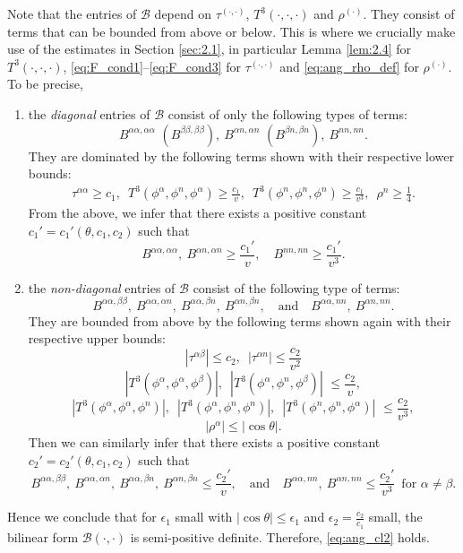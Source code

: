 \documentclass[12pt]{article}
\numberwithin{equation}{section}
\theoremstyle{plain}
\theoremstyle{definition}
\theoremstyle{remark}
\begin{document}
Note that the entries of $\mathcal{B}$ depend on $\tau^{(\cdot, \cdot)}$, $T^3(\cdot, \cdot, \cdot)$ and $\rho^{(\cdot)}$. They consist of terms that can be bounded from above or below. This is where we crucially make use of the estimates in Section \ref{sec:2.1}, in particular Lemma \ref{lem:2.4} for $T^3(\cdot, \cdot, \cdot)$, \eqref{eq:F_cond1}--\eqref{eq:F_cond3} for $\tau^{(\cdot, \cdot)}$ and \eqref{eq:ang_rho_def} for $\rho^{(\cdot)}$. To be precise, 
\begin{enumerate}
\item 
the \emph{diagonal} entries of $\mathcal{B}$ consist of only the following types of terms:
\[
B^{\alpha\alpha,\alpha\alpha}\,\,(B^{\beta\beta,\beta\beta}), 
\ B^{\alpha n,\alpha n}\,\,(B^{\beta n,\beta n}), 
\ B^{nn,nn}.
\]
They are dominated by the following terms shown with their respective lower bounds:
\begin{eqnarray*}
\tau^{\alpha\alpha} \geq c_1,\,\,\,
T^3(\phi^\alpha,\phi^n,\phi^\alpha)\geq \frac{c_1}{v},\,\,\,
T^3(\phi^n,\phi^n,\phi^n)\geq \frac{c_1}{v^3},\,\,\,
\rho^n \geq \frac14.
\end{eqnarray*}
From the above, we infer that there exists a positive constant $c_1'=c_1'(\theta,c_1,c_2)$ such that
\begin{equation*}
    B^{\alpha\alpha,\alpha\alpha}, \ B^{\alpha n,\alpha n} \geq \frac{c_1'}{v}, \quad B^{nn,nn} \geq \frac{c_1'}{v^3}.
\end{equation*}
\item 
the \emph{non-diagonal} entries of $\mathcal{B}$ consist of the following type of terms:
\[
    B^{\alpha\alpha,\beta\beta}, \ B^{\alpha \alpha, \alpha n} , \ B^{\alpha \alpha,\beta n}, \  B^{\alpha n,\beta n}, \quad \text{and}\quad
    B^{\alpha \alpha, n n} , \  B^{\alpha n, n n}.
\]
They are bounded from above by the following terms shown again with their respective
upper bounds:
\[
|\tau^{\alpha\beta}|\leq c_2,\,\,\,
|\tau^{\alpha n}|\leq\frac{c_2}{v^2}
\]\[
\left|T^3(\phi^\alpha, \phi^\alpha, \phi^\beta)\right|,\,\,\,
\left|T^3(\phi^\alpha, \phi^n, \phi^\beta)\right|\,\,\leq \frac{c_2}{v},
\]\[
\left|T^3(\phi^\alpha, \phi^\alpha, \phi^n)\right|,\,\,\,
\left|T^3(\phi^\alpha, \phi^n, \phi^n)\right|,\,\,\,
\left|T^3(\phi^n, \phi^n, \phi^\alpha)\right|\,\,
\leq \frac{c_2}{v^3},
\]\[
\left|\rho^\alpha\right| \leq |\cos\theta|.
\]
Then we can similarly infer that there exists a positive constant $c_2'=c_2'(\theta,c_1,c_2)$ such that
\[
B^{\alpha\alpha,\beta\beta}, \ B^{\alpha \alpha, \alpha n} , \ B^{\alpha \alpha,\beta n}, \  B^{\alpha n,\beta n} \leq \frac{c_2'}{v}, 
\quad \text{and}\quad
    B^{\alpha \alpha, n n} , \  B^{\alpha n, n n} \leq \frac{c_2'}{v^3}
    \,\,\,\text{for $\alpha\neq\beta$.}
\]
\end{enumerate}
Hence we conclude that for $\epsilon_1$ small with $|\cos\theta|\leq \epsilon_1$
and $\epsilon_2=\frac{c_2}{c_1}$ small, the bilinear form $\mathcal{B}(\cdot,\cdot)$ is semi-positive definite. Therefore, \eqref{eq:ang_cl2} holds. 
\end{document}

